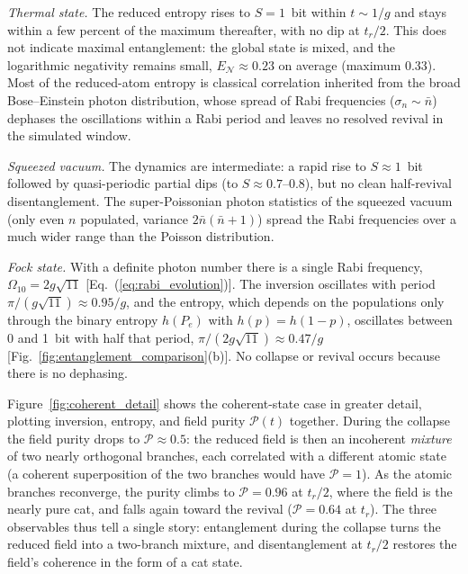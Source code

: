 \documentclass[12pt]{iopart}
\begin{document}
\textit{Thermal state.} The reduced entropy rises to $S = 1$~bit within $t \sim 1/g$ and stays within a few percent of the maximum thereafter, with no dip at $t_r/2$. This does not indicate maximal entanglement: the global state is mixed, and the logarithmic negativity remains small, $E_{\mathcal{N}} \approx 0.23$ on average (maximum 0.33). Most of the reduced-atom entropy is classical correlation inherited from the broad Bose--Einstein photon distribution, whose spread of Rabi frequencies ($\sigma_n \sim \bar{n}$) dephases the oscillations within a Rabi period and leaves no resolved revival in the simulated window.

\textit{Squeezed vacuum.} The dynamics are intermediate: a rapid rise to $S \approx 1$~bit followed by quasi-periodic partial dips (to $S \approx 0.7$--$0.8$), but no clean half-revival disentanglement. The super-Poissonian photon statistics of the squeezed vacuum (only even $n$ populated, variance $2\bar{n}(\bar{n}+1)$) spread the Rabi frequencies over a much wider range than the Poisson distribution.

\textit{Fock state.} With a definite photon number there is a single Rabi frequency, $\Omega_{10} = 2g\sqrt{11}$ [Eq.~(\ref{eq:rabi_evolution})]. The inversion oscillates with period $\pi/(g\sqrt{11}) \approx 0.95/g$, and the entropy, which depends on the populations only through the binary entropy $h(P_e)$ with $h(p) = h(1-p)$, oscillates between 0 and 1~bit with half that period, $\pi/(2g\sqrt{11}) \approx 0.47/g$ [Fig.~\ref{fig:entanglement_comparison}(b)]. No collapse or revival occurs because there is no dephasing.

Figure~\ref{fig:coherent_detail} shows the coherent-state case in greater detail, plotting inversion, entropy, and field purity $\mathcal{P}(t)$ together. During the collapse the field purity drops to $\mathcal{P} \approx 0.5$: the reduced field is then an incoherent \emph{mixture} of two nearly orthogonal branches, each correlated with a different atomic state (a coherent superposition of the two branches would have $\mathcal{P} = 1$). As the atomic branches reconverge, the purity climbs to $\mathcal{P} = 0.96$ at $t_r/2$, where the field is the nearly pure cat, and falls again toward the revival ($\mathcal{P} = 0.64$ at $t_r$). The three observables thus tell a single story: entanglement during the collapse turns the reduced field into a two-branch mixture, and disentanglement at $t_r/2$ restores the field's coherence in the form of a cat state.
\end{document}
